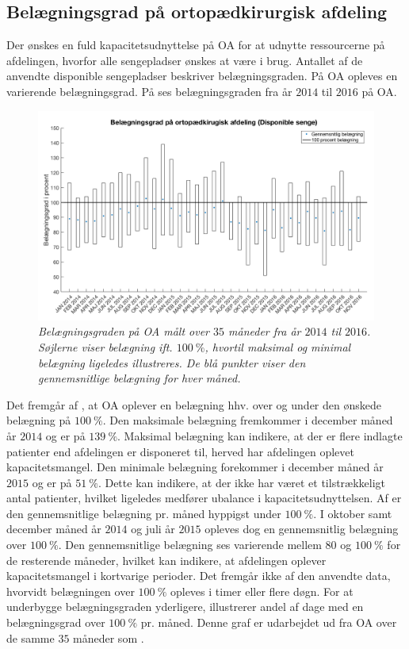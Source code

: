 \clearpage
\subsection{Belægningsgrad på ortopædkirurgisk afdeling}\label{omfang}
Der ønskes en fuld kapacitetsudnyttelse på OA for at udnytte ressourcerne på afdelingen, hvorfor alle sengepladser ønskes at være i brug. Antallet af de anvendte disponible sengepladser beskriver belægningsgraden. På OA opleves en varierende belægningsgrad. På  ses belægningsgraden fra år $2014$ til $2016$ på OA.\cite{SDS2015}

\begin{figure}[H]
	\centering
	\includegraphics[scale=.35]{figures/belaegningsgradny.png}
	\caption{\textit{Belægningsgraden på OA målt over $35$ måneder fra år $2014$ til $2016$. Søjlerne viser belægning ift. $100~\%$, hvortil maksimal og minimal belægning ligeledes illustreres. De blå punkter viser den gennemsnitlige belægning for hver måned.}\cite{SDS2015}}
	\label{maxminbelaeg}
\end{figure}

\noindent
Det fremgår af , at OA oplever en belægning hhv. over og under den ønskede belægning på $100~\%$. Den maksimale belægning fremkommer i december måned år $2014$ og er på $139~\%$. Maksimal belægning kan indikere, at der er flere indlagte patienter end afdelingen er disponeret til, herved har afdelingen oplevet kapacitetsmangel. Den minimale belægning forekommer i december måned år $2015$ og er på $51~\%$. Dette kan indikere, at der ikke har været et tilstrækkeligt antal patienter, hvilket ligeledes medfører ubalance i kapacitetsudnyttelsen. Af  er den gennemsnitlige belægning pr. måned hyppigst under $100~\%$. I oktober samt december måned år $2014$ og juli år $2015$ opleves dog en gennemsnitlig belægning over $100~\%$. Den gennemsnitlige belægning ses varierende mellem $80$ og $100~\%$ for de resterende måneder, hvilket kan indikere, at afdelingen oplever kapacitetsmangel i kortvarige perioder.
Det fremgår ikke af den anvendte data, hvorvidt belægningen over $100~\%$ opleves i timer eller flere døgn.
For at underbygge belægningsgraden yderligere, illustrerer  andel af dage med en belægningsgrad over $100~\%$ pr. måned. 
Denne graf er udarbejdet ud fra OA over de samme $35$ måneder som .\cite{SDS2015} 

